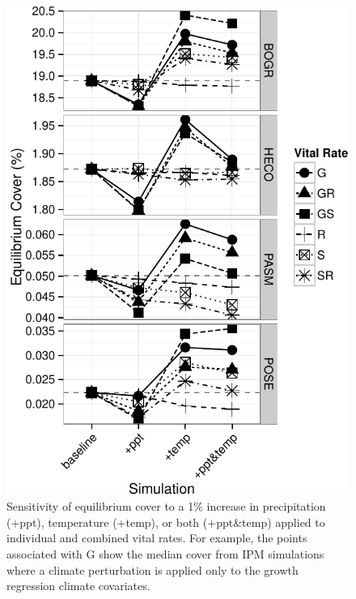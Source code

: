 \documentclass[12pt,]{article}
\begin{document}
\begin{figure}[htbp]
\centering
\includegraphics{components/figure/manuscript-figure_2.pdf}
\caption{Sensitivity of equilibrium cover to a 1\% increase in
precipitation (+ppt), temperature (+temp), or both (+ppt\&temp) applied
to individual and combined vital rates. For example, the points
associated with G show the median cover from IPM simulations where a
climate perturbation is applied only to the growth regression climate
covariates.}
\end{figure}
\end{document}
